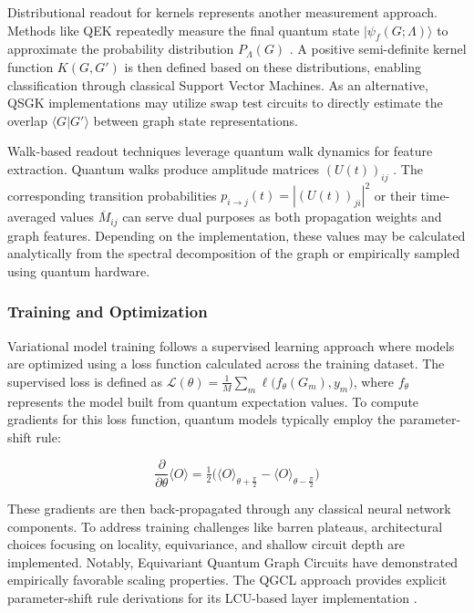 \documentclass[11pt]{article}
\begin{document}
Distributional readout for kernels represents another measurement approach. Methods like QEK repeatedly measure the final quantum state $|\psi_f(G;\Lambda)\rangle$ to approximate the probability distribution $P_\Lambda(G)$ \citep{schuld2019feature,havlivcek2019qkernels,kishi2021qsgk,henry2021quantum}. A positive semi-definite kernel function $K(G,G')$ is then defined based on these distributions, enabling classification through classical Support Vector Machines. As an alternative, QSGK implementations may utilize swap test circuits to directly estimate the overlap $\langle G|G'\rangle$ between graph state representations.

Walk-based readout techniques leverage quantum walk dynamics for feature extraction. Quantum walks produce amplitude matrices $(U(t))_{ij}$ \citep{godsil2013avgmixing,coutinho2017avgmixing}. The corresponding transition probabilities $p_{i\to j}(t)=| (U(t))_{ji}|^2$ or their time-averaged values $\overline{M}_{ij}$ can serve dual purposes as both propagation weights and graph features. Depending on the implementation, these values may be calculated analytically from the spectral decomposition of the graph or empirically sampled using quantum hardware.

\subsubsection*{Training and Optimization}

Variational model training \citep{mitarai2018quantum,mcclean2018barren,cerezo2021barren,mernyei2021eqgc} follows a supervised learning approach where models are optimized using a loss function calculated across the training dataset. The supervised loss is defined as $\mathcal{L}(\theta)=\frac{1}{M}\sum_{m}\ell\big(f_\theta(G_m),y_m\big)$, where $f_\theta$ represents the model built from quantum expectation values. To compute gradients for this loss function, quantum models typically employ the parameter-shift rule:

$$
\frac{\partial}{\partial\theta}\langle O\rangle
=\tfrac{1}{2}\Big(\langle O\rangle_{\theta+\frac{\pi}{2}}-\langle O\rangle_{\theta-\frac{\pi}{2}}\Big)
$$

These gradients are then back-propagated through any classical neural network components. To address training challenges like barren plateaus, architectural choices focusing on locality, equivariance, and shallow circuit depth are implemented. Notably, Equivariant Quantum Graph Circuits have demonstrated empirically favorable scaling properties. The QGCL approach provides explicit parameter-shift rule derivations for its LCU-based layer implementation \citep{zheng2021qgcn}.
\end{document}
